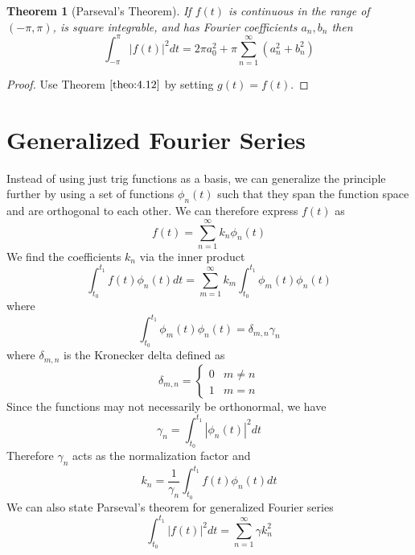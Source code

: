 \documentclass{report}
\newtheorem{theorem}{Theorem}[chapter]
\theoremstyle{definition}
\theoremstyle{remark}
\begin{document}
\begin{theorem}[Parseval's Theorem]
    If $f(t)$ is continuous in the range of $(-\pi,\pi)$, is square integrable, and has Fourier coefficients $a_n,b_n$ then 
    \begin{equation*}
        \int^\pi_{-\pi}|f(t)|^2dt = 2\pi a_0^2+\pi\sum^\infty_{n=1}(a^2_n+b_n^2)
    \end{equation*}
\end{theorem}
\begin{proof}
    Use Theorem $\ref{theo:4.12}$ by setting $g(t)=f(t)$.
\end{proof}

\section{Generalized Fourier Series}
Instead of using just trig functions as a basis, we can generalize the principle further by using a set of functions $\phi_n(t)$ such that they span the function space and are orthogonal to each other. We can therefore express $f(t)$ as 
\begin{equation*}
    f(t)= \sum^\infty_{n=1}k_n \phi_n(t)
\end{equation*}
We find the coefficients $k_n$ via the inner product 
\begin{equation*}
    \int^{t_1}_{t_0}f(t)\phi_n(t)dt = \sum^\infty_{m=1}k_m\int^{t_1}_{t_0}\phi_m(t)\phi_n(t)
\end{equation*}
where \begin{equation*}
    \int^{t_1}_{t_0}\phi_m(t)\phi_n(t) = \delta_{m,n}\gamma_n
\end{equation*}
where $\delta_{m,n}$ is the Kronecker delta defined as 
\begin{equation*}
    \delta_{m,n} = \begin{cases}
        0 &m\neq n\\ 1 &m=n
    \end{cases}
\end{equation*}
Since the functions may not necessarily be orthonormal, we have 
\begin{equation*}
    \gamma_n = \int^{t_1}_{t_0}|\phi_n(t)|^2dt
\end{equation*}
Therefore $\gamma_n$ acts as the normalization factor and 
\begin{equation*}
    k_n = \frac{1}{\gamma_n}\int^{t_1}_{t_0}f(t)\phi_n(t)dt
\end{equation*}
We can also state Parseval's theorem for generalized Fourier series 
\begin{equation*}
    \int^{t_1}_{t_0}|f(t)|^2dt = \sum^\infty_{n=1}\gamma k_n^2
\end{equation*}
\end{document}
